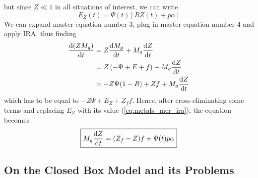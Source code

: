 but since $Z\ll 1$ in all situations of interest, we can write 
\begin{equation}
    E_{Z}(t) = \Psi(t)\left[RZ(t)+p\alpha\right]
    \label{eq:metals_mer_ira}
\end{equation}
We can expand master equation number 3, plug in master equation number 4 and apply IRA, thus finding
\begin{align*}
    \frac{\text{d}(ZM_{g})}{\text{d}t} &= Z\frac{\text{d}M_{g}}{\text{d}t}+M_{g}\frac{\text{d}Z}{\text{d}t}\\
    &=Z\left(-\Psi + E +f\right)+M_{g}\frac{\text{d}Z}{\text{d}t} \\
    &=-Z\Psi(1-R)+Zf+M_{g}\frac{\text{d}Z}{\text{d}t}
\end{align*}
which has to be equal to $-Z\Psi + E_{Z}+Z_{f}f$. Hence, after cross-eliminating some terms and replacing $E_{Z}$ with its value (\ref{eq:metals_mer_ira}), the equation becomes
\begin{equation}
    \boxed{
    M_{g}\frac{\text{d}Z}{\text{d}t} = (Z_{f}-Z)f + \Psi(t)p\alpha
    }
    \label{eq:metallicity_eq}
\end{equation}

\subsection{On the Closed Box Model and its Problems}

